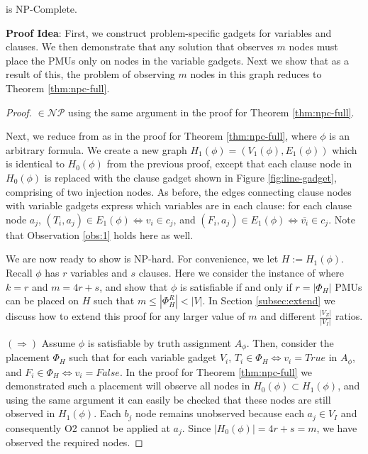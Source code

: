 \begin{theorem}
\maxinc is NP-Complete. %
\label{thm:npc-maxinc}
\end{theorem}

{\bf Proof Idea}: First, we construct problem-specific gadgets for variables and clauses. We then demonstrate that any solution that observes $m$ nodes must place the PMUs only on nodes
in the variable gadgets. Next we show that as a result of this, the problem of observing $m$ nodes in this graph reduces to Theorem \ref{thm:npc-full}.

\begin{proof}
\maxinc $\in \mathcal{NP}$ using the same argument in the proof for Theorem \ref{thm:npc-full}.

Next, we reduce from {\sat} as in the proof for Theorem \ref{thm:npc-full}, where $\phi$ is an arbitrary \sat formula. We create a new graph $H_1(\phi) = (V_1(\phi), E_1(\phi))$ which is identical to $H_0(\phi)$ from the previous proof, except that each clause node in $H_0(\phi)$ is replaced with the clause gadget shown in Figure \ref{fig:line-gadget}, comprising of two injection nodes. As before, the edges connecting clause nodes with variable gadgets express which variables are in each clause: for each clause node $a_j$, $(T_i, a_j)\in E_1(\phi) \Leftrightarrow v_i\in c_j$, and $(F_i, a_j)\in E_1(\phi) \Leftrightarrow \overline{v_i}\in c_j$. Note that Observation \ref{obs:1} holds here as well.




We are now ready to show \maxinc is NP-hard. For convenience, we let $H := H_1(\phi)$.  Recall $\phi$ has $r$ variables and $s$ clauses. 
Here we consider the instance of \maxinc where $k=r$ and $m = 4r + s$, and show that $\phi$ is satisfiable if and only if $r=|\Phi_H|$ PMUs
can be placed on $H$ such that $m \leq |\Phi^R_{H}| < |V|$. In Section \ref{subsec:extend} we discuss how to extend this proof for any larger value of $m$ and different $\frac{|V_Z|}{|V_I|}$ ratios.

$(\Rightarrow)$ Assume $\phi$ is satisfiable by truth assignment $A_{\phi}$. Then, consider the placement $\Phi_H$ such that for each variable gadget $V_i$, $T_i\in \Phi_H \Leftrightarrow v_i=True$
in $A_\phi$, and  $F_i\in \Phi_H \Leftrightarrow v_i=False$.  In the proof for Theorem \ref{thm:npc-full} we demonstrated such a placement will observe all nodes in $H_0(\phi)\subset H_1(\phi)$, and using the same argument it can easily be checked that these nodes are still observed in $H_1(\phi)$. Each $b_j$ node remains unobserved because each $a_j \in V_I$ and consequently O2 cannot be applied at $a_j$.
Since $|H_0(\phi)|=4r+s = m$, we have observed the required nodes.


\end{proof}
